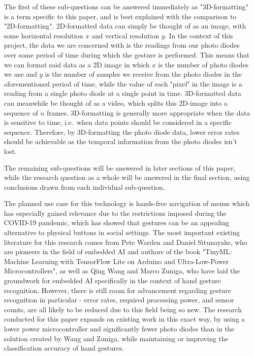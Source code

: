 The first of these sub-questions can be answered immediately as "3D-formatting" is a term specific to this paper, and is best explained with the comparison to "2D-formatting".
2D-formatted data can simply be thought of as an image, with some horizontal resolution $x$ and vertical resolution $y$.
In the context of this project, the data we are concerned with is the readings from our photo diodes over some period of time during which the gesture is performed.
This means that we can format said data as a 2D image in which $x$ is the number of photo diodes we use and $y$ is the number of samples we receive from the photo diodes in the aforementioned period of time, while the value of each "pixel" in the image is a reading from a single photo diode at a single point in time.
3D-formatted data can meanwhile be thought of as a video, which splits this 2D-image into a sequence of $n$ frames.
3D-formatting is generally more appropriate when the data is sensitive to time, i.e.\ when data points should be considered in a specific sequence.
Therefore, by 3D-formatting the photo diode data, lower error rates should be achievable as the temporal information from the photo diodes isn't lost.

The remaining sub-questions will be answered in later sections of this paper, while the research question as a whole will be answered in the final section, using conclusions drawn from each individual sub-question.

The planned use case for this technology is hands-free navigation of menus which has especially gained relevance due to the restrictions imposed during the COVID-19 pandemic, which has showed that gestures can be an appealing alternative to physical buttons in social settings.
The most important existing literature for this research comes from Pete Warden and Daniel Situnayake, who are pioneers in the field of embedded AI and authors of the book "TinyML: Machine Learning with TensorFlow Lite on Arduino and Ultra-Low-Power Microcontrollers"\cite{warden2020tinyml}, as well as Qing Wang and Marco Zuniga, who have laid the groundwork for embedded AI specifically in the context of hand gesture recognition\cite{10.1145/3412449.3412551}.
However, there is still room for advancement regarding gesture recognition in particular - error rates, required processing power, and sensor counts, are all likely to be reduced due to this field being so new.
The research conducted for this paper expands on existing work in this exact way, by using a lower power microcontroller and significantly fewer photo diodes than in the solution created by Wang and Zuniga, while maintaining or improving the classification accuracy of hand gestures.
